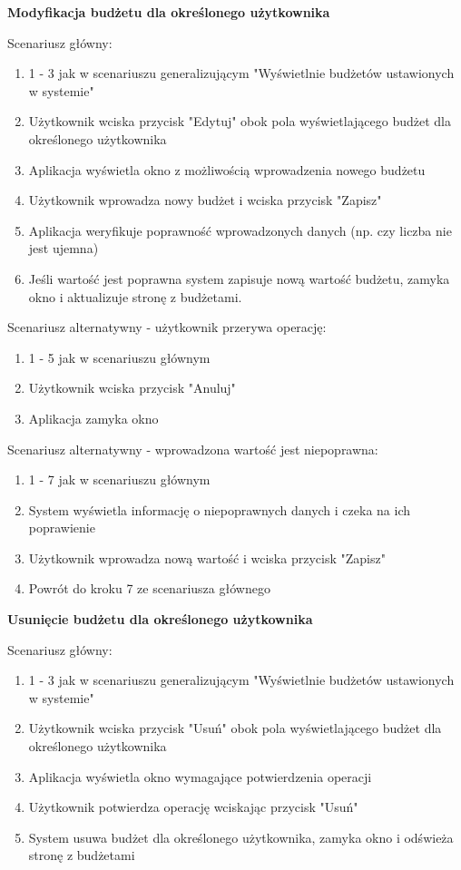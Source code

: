 \textbf{Modyfikacja budżetu dla określonego użytkownika}

Scenariusz główny:
\begin{enumerate}
  \item 1 - 3 jak w scenariuszu generalizującym "Wyświetlnie budżetów ustawionych w systemie"
  \item Użytkownik wciska przycisk "Edytuj" obok pola wyświetlającego budżet dla określonego użytkownika
  \item Aplikacja wyświetla okno z możliwością wprowadzenia nowego budżetu
  \item Użytkownik wprowadza nowy budżet i wciska przycisk "Zapisz"
  \item Aplikacja weryfikuje poprawność wprowadzonych danych (np. czy liczba nie jest ujemna)
  \item Jeśli wartość jest poprawna system zapisuje nową wartość budżetu, zamyka okno i aktualizuje stronę z budżetami.
\end{enumerate}

Scenariusz alternatywny - użytkownik przerywa operację:
\begin{enumerate}
  \item 1 - 5 jak w scenariuszu głównym
  \item Użytkownik wciska przycisk "Anuluj"
  \item Aplikacja zamyka okno
\end{enumerate}

Scenariusz alternatywny - wprowadzona wartość jest niepoprawna:
\begin{enumerate}
  \item 1 - 7 jak w scenariuszu głównym
  \item System wyświetla informację o niepoprawnych danych i czeka na ich poprawienie
  \item Użytkownik wprowadza nową wartość i wciska przycisk "Zapisz"
  \item Powrót do kroku 7 ze scenariusza głównego
\end{enumerate}

\textbf{Usunięcie budżetu dla określonego użytkownika}

Scenariusz główny:
\begin{enumerate}
  \item 1 - 3 jak w scenariuszu generalizującym "Wyświetlnie budżetów ustawionych w systemie"
  \item Użytkownik wciska przycisk "Usuń" obok pola wyświetlającego budżet dla określonego użytkownika
  \item Aplikacja wyświetla okno wymagające potwierdzenia operacji
  \item Użytkownik potwierdza operację wciskając przycisk "Usuń"
  \item System usuwa budżet dla określonego użytkownika, zamyka okno i odświeża stronę z budżetami
\end{enumerate}

